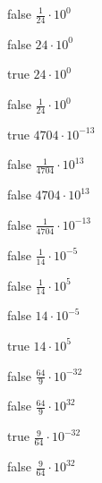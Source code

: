 \begin{reponses}
    \item[false] $\frac{1}{24}\cdot 10^{0}$
    \item[false] $24\cdot 10^{0}$
    \item[true] $24\cdot 10^{0}$
    \item[false] $\frac{1}{24}\cdot 10^{0}$
\end{reponses}

\begin{question}{1211}{Calcul}{0{{/}
    Que vaut $\frac{7\cdot 10^{-8}\times 4\cdot 10^{-8}\times 3\cdot 10^{-4}\times 7\cdot 10^{7}\times 8\cdot 10^{-4}}{1\cdot 10^{-4}}$?
\end{question}

\begin{reponses}
    \item[true] $4704\cdot 10^{-13}$
    \item[false] $\frac{1}{4704}\cdot 10^{13}$
    \item[false] $4704\cdot 10^{13}$
    \item[false] $\frac{1}{4704}\cdot 10^{-13}$
\end{reponses}

\begin{question}{1211}{Calcul}{0{{/}
    Que vaut $\frac{4\cdot 10^{3}\times 3\cdot 10^{0}\times 4\cdot 10^{1}\times 7\cdot 10^{-8}}{6\cdot 10^{-3}\times 4\cdot 10^{-6}}$?
\end{question}

\begin{reponses}
    \item[false] $\frac{1}{14}\cdot 10^{-5}$
    \item[false] $\frac{1}{14}\cdot 10^{5}$
    \item[false] $14\cdot 10^{-5}$
    \item[true] $14\cdot 10^{5}$
\end{reponses}

\begin{question}{1211}{Calcul}{0{{/}
    Que vaut $\frac{9\cdot 10^{-7}\times 1\cdot 10^{-4}\times 3\cdot 10^{1}\times 5\cdot 10^{-9}\times 4\cdot 10^{10}}{6\cdot 10^{-8}\times 8\cdot 10^{7}\times 4\cdot 10^{7}\times 5\cdot 10^{9}\times 4\cdot 10^{8}}$?
\end{question}

\begin{reponses}
    \item[false] $\frac{64}{9}\cdot 10^{-32}$
    \item[false] $\frac{64}{9}\cdot 10^{32}$
    \item[true] $\frac{9}{64}\cdot 10^{-32}$
    \item[false] $\frac{9}{64}\cdot 10^{32}$
\end{reponses}

